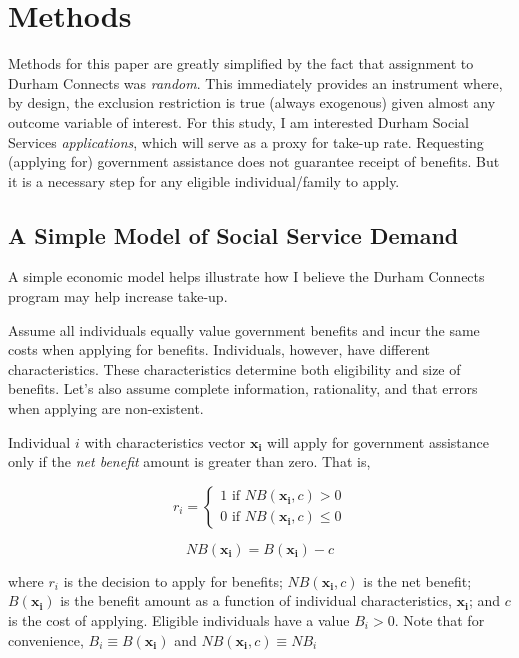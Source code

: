 \documentclass[12pt,letterpaperpaper,]{book}
\begin{document}
\section*{Methods}\label{methods-2}

Methods for this paper are greatly simplified by the fact that
assignment to Durham Connects was \emph{random}. This immediately
provides an instrument where, by design, the exclusion restriction is
true (always exogenous) given almost any outcome variable of interest.
For this study, I am interested Durham Social Services
\emph{applications}, which will serve as a proxy for take-up rate.
Requesting (applying for) government assistance does not guarantee
receipt of benefits. But it is a necessary step for any eligible
individual/family to apply.

\subsection*{A Simple Model of Social Service
Demand}\label{a-simple-model-of-social-service-demand}

A simple economic model helps illustrate how I believe the Durham
Connects program may help increase take-up.

Assume all individuals equally value government benefits and incur the
same costs when applying for benefits. Individuals, however, have
different characteristics. These characteristics determine both
eligibility and size of benefits. Let's also assume complete
information, rationality, and that errors when applying are
non-existent.

Individual \(i\) with characteristics vector \(\bm{x_i}\) will apply for
government assistance only if the \emph{net benefit} amount is greater
than zero. That is,

\[
r_i  = \left \{ 
  \begin{array}{c} 
    1 \text{ if } NB(\bm{x_i}, c) > 0 \\ 
    0 \text{ if } NB(\bm{x_i}, c) \le 0 
  \end{array} \right.
\]

\[
  NB(\bm{x_i}) = B(\bm{x_i}) - c
\]

where \(r_i\) is the decision to apply for benefits; \(NB(\bm{x_i}, c)\)
is the net benefit; \(B(\bm{x_i})\) is the benefit amount as a function
of individual characteristics, \(\bm{x_i}\); and \(c\) is the cost of
applying. Eligible individuals have a value \(B_i > 0\). Note that for
convenience, \(B_i \equiv B(\bm{x_i})\) and
\(NB(\bm{x_i}, c) \equiv NB_i\)
\end{document}
